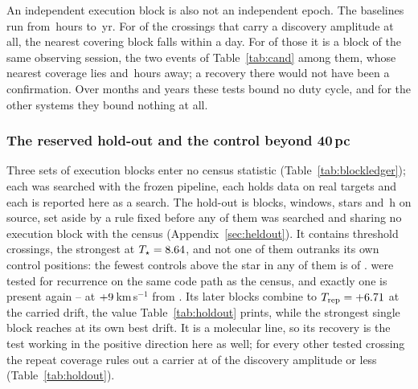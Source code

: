 An independent execution block is also not an independent epoch. The baselines run from \RcSepMinH\,hours to \RcSepMaxYr\,yr. For
\RcNSepSameDay{} of the \RcNExclPoss{} crossings that carry a discovery
amplitude at all, the nearest covering block falls within a day. For
\QcNHazard{} of those it is a block of the same observing session, the two
events of Table~\ref{tab:cand} among them, whose nearest coverage lies
\QcEvSepOneH{} and \QcEvSepTwoH\,hours away; a recovery there would not have
been a confirmation. Over months and years these tests
bound no duty cycle, and for the other \ZcNoRepSys{} systems they bound
nothing at all.

\subsubsection{The reserved hold-out and the control beyond 40\,pc}
\label{sec:holdoutsearch}

Three sets of execution blocks enter no census statistic
(Table~\ref{tab:blockledger}); each was searched with the frozen pipeline, each
holds data on real targets and each is reported here as a search. The hold-out is \HoNBlock{} blocks, \HoNWin{} windows, \HoNStar{} stars
and \HoHours\,h on source, set aside by a rule fixed before any of them was
searched and sharing no execution block with the census
(Appendix~\ref{sec:heldout}). It contains \HoNCross{} threshold crossings,
the strongest at $T_\star=8.64$, and not one of them outranks its own
control positions: the fewest controls above the star in any of them is
\HoNCtrlMin{} of \NCtrl. \HoNTested{} were tested for recurrence on the same
code path as the census, and exactly one is present again -- \HoRecStar{} at
$+9$\,km\,s$^{-1}$ from \HoRecLine. Its \HoRecNRep{} later blocks
combine to $T_{\rm rep}=+6.71$ at the carried drift, the value
Table~\ref{tab:holdout} prints, while the strongest single block reaches
\HoRecTAnyDrift{} at its own best drift. It is a molecular line, so its
recovery is the test working in the positive direction here as well; for
every other tested crossing the repeat coverage rules out a carrier at
\HoFracMax{} of the discovery amplitude or less (Table~\ref{tab:holdout}).

